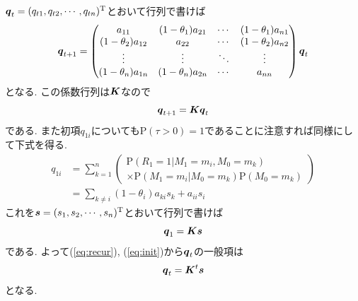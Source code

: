 $ \boldsymbol{q}_t = (q_{t 1} , q_{t 2} , \cdots , q_{t n})^\mathrm{T} $とおいて行列で書けば
\begin{equation}
    \boldsymbol{q}_{t + 1} =
    \begin{pmatrix}
        a_{1 1} & (1-\theta_1) a_{2 1} & \cdots & (1-\theta_1) a_{n 1} \\
        (1-\theta_2) a_{1 2} & a_{2 2} & \cdots & (1-\theta_2) a_{n 2} \\
        \vdots & \vdots & \ddots & \vdots \\
        (1-\theta_n) a_{1 n} & (1-\theta_n) a_{2 n} & \cdots & a_{n n} \\
    \end{pmatrix}
   \boldsymbol{q}_t
\end{equation}
となる. この係数行列は$ \boldsymbol{K} $なので
\begin{equation} \label{eq:recur}
    \boldsymbol{q}_{t + 1} = \boldsymbol{K} \boldsymbol{q}_t
\end{equation}
である. また初項$ q_{1 i} $についても$ \mathrm{P}(\tau > 0) = 1 $であることに注意すれば同様にして下式を得る. 
\begin{align}
    q_{1 i} & =\sum_{k=1}^n \left(
        \begin{array}{l}
            \mathrm{P}(R_1 = 1 | M_1 = m_i , M_0 = m_k) \\
            \times \mathrm{P}(M_1 = m_i | M_0 = m_k) \mathrm{P}(M_0 = m_k)
        \end{array}
    \right) \\
    & =\sum_{k \ne i} (1 - \theta_i) a_{k i} s_k + a_{i i} s_i \label{eq:q1i}
\end{align}
これを$ \boldsymbol{s} = (s_1 , s_2 , \cdots , s_n)^\mathrm{T} $とおいて行列で書けば
\begin{equation} \label{eq:init}
    \boldsymbol{q}_1 = \boldsymbol{K} \boldsymbol{s}
\end{equation}
である. よって(\ref{eq:recur}), (\ref{eq:init})から$ \boldsymbol{q}_t $の一般項は
\begin{equation} \label{eq:qt}
    \boldsymbol{q}_t = \boldsymbol{K}^t \boldsymbol{s}
\end{equation}
となる. 

